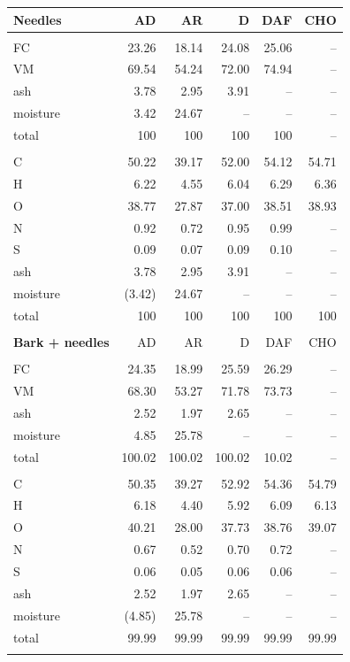\begin{longtable}{lrrrrr}
    \textbf{Needles} & AD & AR & D & DAF & CHO \\
    \hline \\
    FC       & 23.26  & 18.14  & 24.08  & 25.06  & -- \\
    VM       & 69.54  & 54.24  & 72.00  & 74.94  & -- \\
    ash      & 3.78   & 2.95   & 3.91   & --     & -- \\
    moisture & 3.42   & 24.67  & --     & --     & -- \\
    total    & 100    & 100    & 100    & 100    & -- \\
    \\
    C        & 50.22  & 39.17  & 52.00  & 54.12  & 54.71 \\
    H        & 6.22   & 4.55   & 6.04   & 6.29   & 6.36 \\
    O        & 38.77  & 27.87  & 37.00  & 38.51  & 38.93 \\
    N        & 0.92   & 0.72   & 0.95   & 0.99   & -- \\
    S        & 0.09   & 0.07   & 0.09   & 0.10   & -- \\
    ash      & 3.78   & 2.95   & 3.91   & --     & -- \\
    moisture & (3.42) & 24.67  & --     & --     & -- \\
    total    & 100    & 100    & 100    & 100    & 100 \\
    \\

    \textbf{Bark + needles} & AD & AR & D & DAF & CHO \\
    \hline \\
    FC       & 24.35  & 18.99  & 25.59  & 26.29  & -- \\
    VM       & 68.30  & 53.27  & 71.78  & 73.73  & -- \\
    ash      & 2.52   & 1.97   & 2.65   & --     & -- \\
    moisture & 4.85   & 25.78  & --     & --     & -- \\
    total    & 100.02 & 100.02 & 100.02 & 10.02  & -- \\
    \\
    C        & 50.35  & 39.27  & 52.92  & 54.36  & 54.79 \\
    H        & 6.18   & 4.40   & 5.92   & 6.09   & 6.13 \\
    O        & 40.21  & 28.00  & 37.73  & 38.76  & 39.07 \\
    N        & 0.67   & 0.52   & 0.70   & 0.72   & -- \\
    S        & 0.06   & 0.05   & 0.06   & 0.06   & -- \\
    ash      & 2.52   & 1.97   & 2.65   & --     & -- \\
    moisture & (4.85) & 25.78  & --     & --     & -- \\
    total    & 99.99  & 99.99  & 99.99  & 99.99  & 99.99 \\
    \\


\end{longtable}
